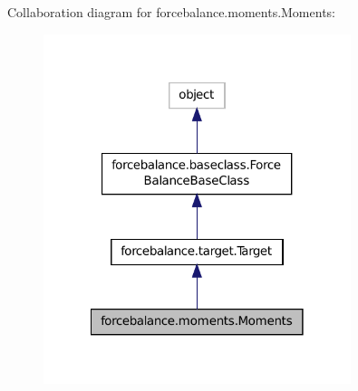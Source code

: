Collaboration diagram for forcebalance.\-moments.\-Moments\-:\nopagebreak
\begin{figure}[H]
\begin{center}
\leavevmode
\includegraphics[width=254pt]{classforcebalance_1_1moments_1_1Moments__coll__graph}
\end{center}
\end{figure}
